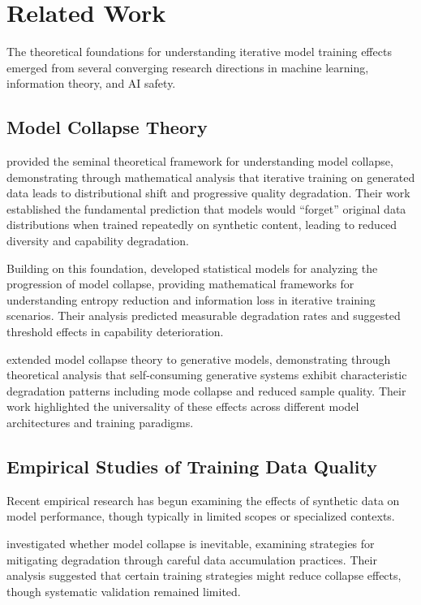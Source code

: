 \documentclass{article}
\begin{document}
\section{Related Work}

The theoretical foundations for understanding iterative model training effects emerged from several converging research directions in machine learning, information theory, and AI safety.

\subsection{Model Collapse Theory}

\citet{shumailov2023curse} provided the seminal theoretical framework for understanding model collapse, demonstrating through mathematical analysis that iterative training on generated data leads to distributional shift and progressive quality degradation. Their work established the fundamental prediction that models would ``forget'' original data distributions when trained repeatedly on synthetic content, leading to reduced diversity and capability degradation.

Building on this foundation, \citet{seddik2024bad} developed statistical models for analyzing the progression of model collapse, providing mathematical frameworks for understanding entropy reduction and information loss in iterative training scenarios. Their analysis predicted measurable degradation rates and suggested threshold effects in capability deterioration.

\citet{alemohammad2023self} extended model collapse theory to generative models, demonstrating through theoretical analysis that self-consuming generative systems exhibit characteristic degradation patterns including mode collapse and reduced sample quality. Their work highlighted the universality of these effects across different model architectures and training paradigms.

\subsection{Empirical Studies of Training Data Quality}

Recent empirical research has begun examining the effects of synthetic data on model performance, though typically in limited scopes or specialized contexts.

\citet{gerstgrasser2024model} investigated whether model collapse is inevitable, examining strategies for mitigating degradation through careful data accumulation practices. Their analysis suggested that certain training strategies might reduce collapse effects, though systematic validation remained limited.
\end{document}

